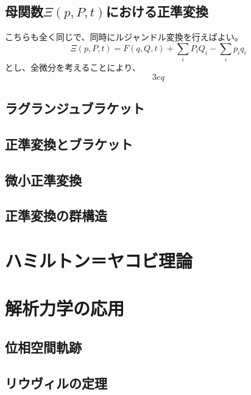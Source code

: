 \documentclass[a4paper]{jsreport}
\begin{document}
        \section{母関数$\Xi(p, P, t)$における正準変換}
            こちらも全く同じで、同時にルジャンドル変換を行えばよい。
            \begin{equation}
                \Xi(p, P, t) = F(q, Q, t) + \sum_{i} P_i Q_i - \sum_{i} p_i q_i
            \end{equation}
            とし、全微分を考えることにより、
            \begin{equation}
                3eq
            \end{equation}

        \section{ラグランジュブラケット}
        \section{正準変換とブラケット}
        \section{微小正準変換}
        \section{正準変換の群構造}
    \chapter{ハミルトン＝ヤコビ理論}

    \chapter{解析力学の応用}
        \section{位相空間軌跡}
        \section{リウヴィルの定理}
\end{document}

